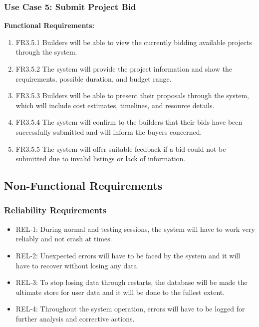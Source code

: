 \subsubsection{Use Case 5: Submit Project Bid}

\textbf{Functional Requirements:}
\begin{enumerate}
    \item FR3.5.1 Builders will be able to view the currently bidding available projects through the system.
    \item FR3.5.2 The system will provide the project information and show the requirements, possible duration, and budget range.
    \item FR3.5.3 Builders will be able to present their proposals through the system, which will include cost estimates, timelines, and resource details.
    \item FR3.5.4 The system will confirm to the builders that their bids have been successfully submitted and will inform the buyers concerned.
    \item FR3.5.5 The system will offer suitable feedback if a bid could not be submitted due to invalid listings or lack of information.
\end{enumerate}

\subsection{Non-Functional Requirements}

\subsubsection{Reliability Requirements}

\begin{itemize}
    \item REL-1: During normal and testing sessions, the system will have to work very reliably and not crash at times.
    \item REL-2: Unexpected errors will have to be faced by the system and it will have to recover without losing any data.
    \item REL-3: To stop losing data through restarts, the database will be made the ultimate store for user data and it will be done to the fullest extent.
    \item REL-4: Throughout the system operation, errors will have to be logged for further analysis and corrective actions.
\end{itemize}

